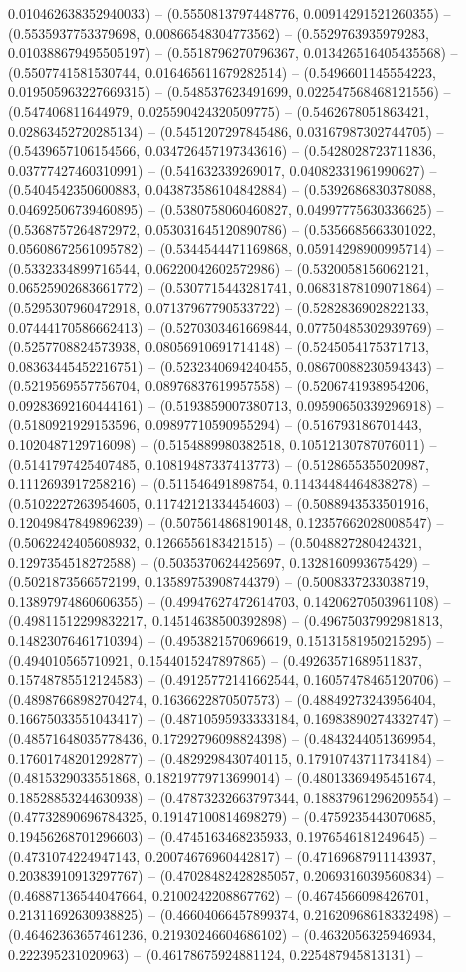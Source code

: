 0.010462638352940033) -- (0.5550813797448776, 0.00914291521260355) -- (0.5535937753379698, 0.00866548304773562) -- (0.5529763935979283, 0.010388679495505197) -- (0.5518796270796367, 0.013426516405435568) -- (0.5507741581530744, 0.016465611679282514) -- (0.5496601145554223, 0.019505963227669315) -- (0.548537623491699, 0.022547568468121556) -- (0.547406811644979, 0.025590424320509775) -- (0.5462678051863421, 0.02863452720285134) -- (0.5451207297845486, 0.03167987302744705) -- (0.5439657106154566, 0.034726457197343616) -- (0.5428028723711836, 0.03777427460310991) -- (0.541632339269017, 0.04082331961990627) -- (0.5404542350600883, 0.043873586104842884) -- (0.5392686830378088, 0.04692506739460895) -- (0.5380758060460827, 0.04997775630336625) -- (0.5368757264872972, 0.053031645120890786) -- (0.5356685663301022, 0.05608672561095782) -- (0.5344544471169868, 0.05914298900995714) -- (0.5332334899716544, 0.06220042602572986) -- (0.5320058156062121, 0.06525902683661772) -- (0.5307715443281741, 0.06831878109071864) -- (0.5295307960472918, 0.07137967790533722) -- (0.5282836902822133, 0.07444170586662413) -- (0.5270303461669844, 0.07750485302939769) -- (0.5257708824573938, 0.08056910691714148) -- (0.5245054175371713, 0.08363445452216751) -- (0.5232340694240455, 0.08670088230594343) -- (0.5219569557756704, 0.08976837619957558) -- (0.5206741938954206, 0.09283692160444161) -- (0.5193859007380713, 0.09590650339296918) -- (0.5180921929153596, 0.09897710590955294) -- (0.516793186701443, 0.1020487129716098) -- (0.5154889980382518, 0.10512130787076011) -- (0.5141797425407485, 0.10819487337413773) -- (0.5128655355020987, 0.1112693917258216) -- (0.511546491898754, 0.11434484464838278) -- (0.5102227263954605, 0.11742121334454603) -- (0.5088943533501916, 0.12049847849896239) -- (0.5075614868190148, 0.12357662028008547) -- (0.5062242405608932, 0.1266556183421515) -- (0.5048827280424321, 0.1297354518272588) -- (0.5035370624425697, 0.1328160993675429) -- (0.5021873566572199, 0.13589753908744379) -- (0.5008337233038719, 0.13897974860606355) -- (0.49947627472614703, 0.14206270503961108) -- (0.49811512299832217, 0.14514638500392898) -- (0.49675037992981813, 0.14823076461710394) -- (0.4953821570696619, 0.15131581950215295) -- (0.494010565710921, 0.1544015247897865) -- (0.49263571689511837, 0.15748785512124583) -- (0.49125772141662544, 0.16057478465120706) -- (0.48987668982704274, 0.1636622870507573) -- (0.48849273243956404, 0.16675033551043417) -- (0.48710595933333184, 0.16983890274332747) -- (0.48571648035778436, 0.17292796098824398) -- (0.4843244051369954, 0.17601748201292877) -- (0.4829298430740115, 0.17910743711734184) -- (0.4815329033551868, 0.18219779713699014) -- (0.48013369495451674, 0.18528853244630938) -- (0.47873232663797344, 0.18837961296209554) -- (0.47732890696784325, 0.19147100814698279) -- (0.4759235443070685, 0.19456268701296603) -- (0.4745163468235933, 0.1976546181249645) -- (0.4731074224947143, 0.20074676960442817) -- (0.47169687911143937, 0.20383910913297767) -- (0.47028482428285057, 0.2069316039560834) -- (0.46887136544047664, 0.2100242208867762) -- (0.4674566098426701, 0.21311692630938825) -- (0.46604066457899374, 0.21620968618332498) -- (0.46462363657461236, 0.21930246604686102) -- (0.4632056325946934, 0.222395231020963) -- (0.46178675924881124, 0.225487945813131) -- 